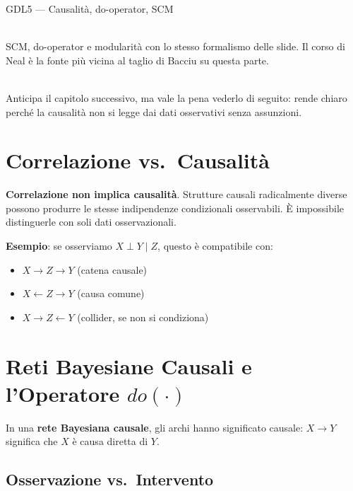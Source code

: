 \begin{risorsevideo}{GDL5 — Causalità, do-operator, SCM}

\medskip
{}\\
SCM, do-operator e modularità con lo stesso formalismo delle slide. Il corso di Neal è la fonte più vicina al taglio di Bacciu su questa parte.

\medskip
{}\\
Anticipa il capitolo successivo, ma vale la pena vederlo di seguito: rende chiaro perché la causalità non si legge dai dati osservativi senza assunzioni.
\end{risorsevideo}

\section{Correlazione vs.\ Causalità}

\begin{tcolorbox}[title=Principio Fondamentale]
\textbf{Correlazione non implica causalità}. Strutture causali radicalmente diverse possono produrre le stesse indipendenze condizionali osservabili. È impossibile distinguerle con soli dati osservazionali.
\end{tcolorbox}

\textbf{Esempio}: se osserviamo $X \perp Y \mid Z$, questo è compatibile con:
\begin{itemize}
    \item $X \to Z \to Y$ (catena causale)
    \item $X \leftarrow Z \to Y$ (causa comune)
    \item $X \to Z \leftarrow Y$ (collider, se non si condiziona)
\end{itemize}

\section{Reti Bayesiane Causali e l'Operatore $do(\cdot)$}

In una \textbf{rete Bayesiana causale}, gli archi hanno significato causale: $X \to Y$ significa che $X$ è causa diretta di $Y$.

\subsection{Osservazione vs.\ Intervento}

